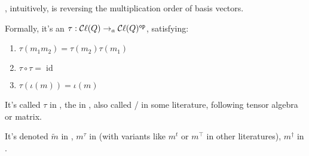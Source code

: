 \begin{definition}
    \label{reverse}
    \leanok

    , intuitively, is reversing the multiplication order of basis vectors.
    
    Formally, it's an  $\tau : \mathop{\mathcal{C}\ell}(Q) \to_{a} \mathop{\mathcal{C}\ell}(Q)^{\mathtt{op}}$, satisfying:

    \begin{enumerate}

    \item $\tau(m_1 m_2) = \tau(m_2) \tau(m_1)$
    \item $\tau \circ \tau = \operatorname{id}$
    \item $\tau(\iota(m)) = \iota(m)$
    
    \end{enumerate}

    It's called  $\tau$ in \cite{jadczyk2019notes}, the  in \cite{gallier2008clifford},
    also called / in some literature, following tensor algebra or matrix.

    It's denoted $\tilde{m}$ in \cite{lounestoCliffordAlgebrasSpinors2001}, $m^\tau$ in \cite{jadczyk2019notes} (with variants like $m^t$ or $m^\top$ in other literatures), $m^\dagger$ in \cite{chisolm2012geometric}.

    \begin{figure}[H]
    \centering
    \end{figure}

\end{definition}

